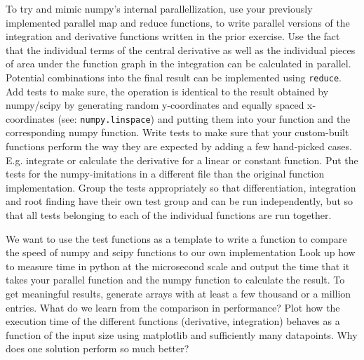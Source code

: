 \documentclass[]{erlangen-problemset}
\begin{document}
\begin{problem}[title={Parallel numpy/scipy replacement}]
\noindent
\Question To try and mimic numpy's internal parallellization, use your previously implemented parallel map and reduce functions, to write parallel versions of the integration and derivative functions written in the prior exercise. 
Use the fact that the individual terms of the central derivative as well as the individual pieces of area under the function graph in the integration can be calculated in parallel. 
Potential combinations into the final result can be implemented using  \texttt{reduce}.
\Question Add tests to make sure, the operation is identical to the result obtained by numpy/scipy by generating random y-coordinates and equally spaced x-coordinates (see: \texttt{numpy.linspace}) and putting them into your function and the corresponding numpy function.
\Question Write tests to make sure that your custom-built functions perform the way they are expected by adding a few hand-picked cases. 
E.g. integrate or calculate the derivative for a linear or constant function.
\Question Put the tests for the numpy-imitations in a different file than the original function implementation.
\Question Group the tests appropriately so that differentiation, integration and root finding have their own test group and can be run independently, but so that all tests belonging to each of the individual functions are run together.
\end{problem}

\begin{problem}[title={Measuring performance}]
We want to use the test functions as a template to write a function to compare the speed of numpy and scipy functions to our own implementation
\noindent
\Question Look up how to measure time in python at the microsecond scale and output the time that it takes your parallel function and the numpy function to calculate the result. To get meaningful results, generate arrays with at least a few thousand or a million entries.
\Question What do we learn from the comparison in performance?
\Question Plot how the execution time of the different functions (derivative, integration) behaves as a function of the input size using matplotlib and sufficiently many datapoints.
\Question Why does one solution perform so much better?
\end{problem}
\end{document}

